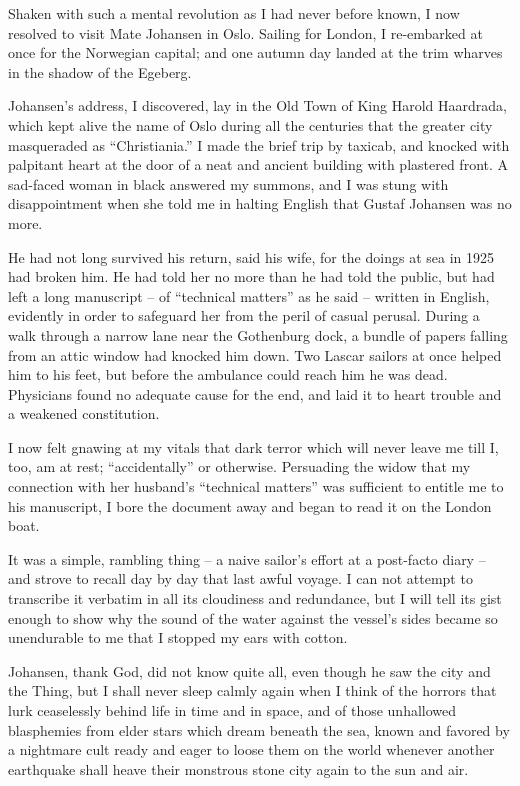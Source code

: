 Shaken with such a mental revolution as I had never before known, I now resolved to visit Mate Johansen in Oslo. Sailing for London, I re-embarked at once for the Norwegian capital; and one autumn day landed at the trim wharves in the shadow of the Egeberg.

Johansen’s address, I discovered, lay in the Old Town of King Harold Haardrada, which kept alive the name of Oslo during all the centuries that the greater city masqueraded as “Christiania.” I made the brief trip by taxicab, and knocked with palpitant heart at the door of a neat and ancient building with plastered front. A sad-faced woman in black answered my summons, and I was stung with disappointment when she told me in halting English that Gustaf Johansen was no more.

He had not long survived his return, said his wife, for the doings at sea in 1925 had broken him. He had told her no more than he had told the public, but had left a long manuscript⁠ – of “technical matters” as he said⁠ – written in English, evidently in order to safeguard her from the peril of casual perusal. During a walk through a narrow lane near the Gothenburg dock, a bundle of papers falling from an attic window had knocked him down. Two Lascar sailors at once helped him to his feet, but before the ambulance could reach him he was dead. Physicians found no adequate cause for the end, and laid it to heart trouble and a weakened constitution.

I now felt gnawing at my vitals that dark terror which will never leave me till I, too, am at rest; “accidentally” or otherwise. Persuading the widow that my connection with her husband’s “technical matters” was sufficient to entitle me to his manuscript, I bore the document away and began to read it on the London boat.

It was a simple, rambling thing⁠ – a naive sailor’s effort at a post-facto diary⁠ – and strove to recall day by day that last awful voyage. I can not attempt to transcribe it verbatim in all its cloudiness and redundance, but I will tell its gist enough to show why the sound of the water against the vessel’s sides became so unendurable to me that I stopped my ears with cotton.

Johansen, thank God, did not know quite all, even though he saw the city and the Thing, but I shall never sleep calmly again when I think of the horrors that lurk ceaselessly behind life in time and in space, and of those unhallowed blasphemies from elder stars which dream beneath the sea, known and favored by a nightmare cult ready and eager to loose them on the world whenever another earthquake shall heave their monstrous stone city again to the sun and air.


